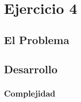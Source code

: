 \section{Ejercicio 4}

\subsection{El Problema}

\subsection{Desarrollo}

\subsubsection{Complejidad}
